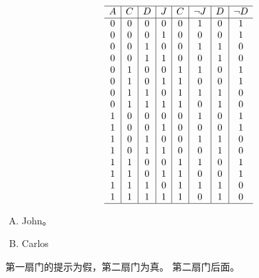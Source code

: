 {{        %
        \begin{practices}
            \begin{table}[H]
                \[
                    \begin{array}{c|c|c|c|c|c|c|c}
                        \hline
                        A & C & D & J & C & \neg J & D & \neg D \\
                        \hline
                        0 & 0 & 0 & 0 & 0 & 1 & 0 & 1 \\
                        0 & 0 & 0 & 1 & 0 & 0 & 0 & 1 \\
                        0 & 0 & 1 & 0 & 0 & 1 & 1 & 0 \\
                        0 & 0 & 1 & 1 & 0 & 0 & 1 & 0 \\
                        0 & 1 & 0 & 0 & 1 & 1 & 0 & 1 \\
                        0 & 1 & 0 & 1 & 1 & 0 & 0 & 1 \\
                        0 & 1 & 1 & 0 & 1 & 1 & 1 & 0 \\
                        0 & 1 & 1 & 1 & 1 & 0 & 1 & 0 \\
                        1 & 0 & 0 & 0 & 0 & 1 & 0 & 1 \\
                        1 & 0 & 0 & 1 & 0 & 0 & 0 & 1 \\
                        1 & 0 & 1 & 0 & 0 & 1 & 1 & 0 \\
                        1 & 0 & 1 & 1 & 0 & 0 & 1 & 0 \\
                        1 & 1 & 0 & 0 & 1 & 1 & 0 & 1 \\
                        1 & 1 & 0 & 1 & 1 & 0 & 0 & 1 \\
                        1 & 1 & 1 & 0 & 1 & 1 & 1 & 0 \\
                        1 & 1 & 1 & 1 & 1 & 0 & 1 & 0 \\
                        \hline
                   \end{array}
               \]
            \end{table}

            \begin{enumerate}[A.]
                \item John。
                \item Carlos
            \end{enumerate}
        \end{practices}

        \begin{practices}
            第一扇门的提示为假，第二扇门为真。
            第二扇门后面。
        \end{practices}

}}
